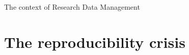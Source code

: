 \documentclass[aspectratio=169, 11pt]{beamer} %
\begin{document}

\maketitle

  

\begin{frame}{The context of Research Data Management}
  \tableofcontents
\end{frame}

%



\section{The reproducibility crisis}
\end{document}
